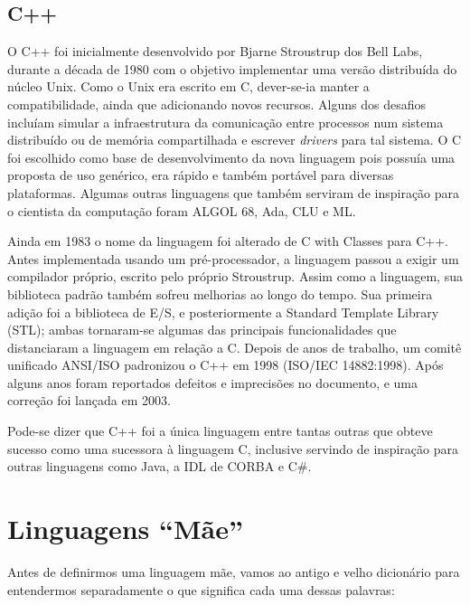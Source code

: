 \documentclass[
    12pt,               %
    openany,            %
    twoside,            %
    a4paper,            %
    brazil              %
    ]{abntex2}
\begin{document}
\chapter{C++}

O C++ foi inicialmente desenvolvido por Bjarne Stroustrup dos Bell Labs,
durante a década de 1980 com o objetivo implementar uma versão distribuída do
núcleo Unix. Como o Unix era escrito em C, dever-se-ia manter a
compatibilidade, ainda que adicionando novos recursos. Alguns dos desafios
incluíam simular a infraestrutura da comunicação entre processos num sistema
distribuído ou de memória compartilhada e escrever \textit{drivers} para tal
sistema. O C foi escolhido como base de desenvolvimento da nova linguagem pois
possuía uma proposta de uso genérico, era rápido e também portável para
diversas plataformas. Algumas outras linguagens que também serviram de
inspiração para o cientista da computação foram ALGOL 68, Ada, CLU e ML.

Ainda em 1983 o nome da linguagem foi alterado de C with Classes para C++.
Antes implementada usando um pré-processador, a linguagem passou a exigir um
compilador próprio, escrito pelo próprio Stroustrup. Assim como a linguagem,
sua biblioteca padrão também sofreu melhorias ao longo do tempo. Sua primeira
adição foi a biblioteca de E/S, e posteriormente a Standard Template Library
(STL); ambas tornaram-se algumas das principais funcionalidades que
distanciaram a linguagem em relação a C.  Depois de anos de trabalho, um comitê
unificado ANSI/ISO padronizou o C++ em 1998 (ISO/IEC 14882:1998). Após alguns
anos foram reportados defeitos e imprecisões no documento, e uma correção foi
lançada em 2003.

Pode-se dizer que C++ foi a única linguagem entre tantas outras que obteve
sucesso como uma sucessora à linguagem C, inclusive servindo de inspiração para
outras linguagens como Java, a IDL de CORBA e C\#.

\part{Linguagens “Mãe”}

Antes de definirmos uma linguagem mãe, vamos ao antigo e velho dicionário para
entendermos separadamente o que significa cada uma dessas palavras: 
\end{document}
